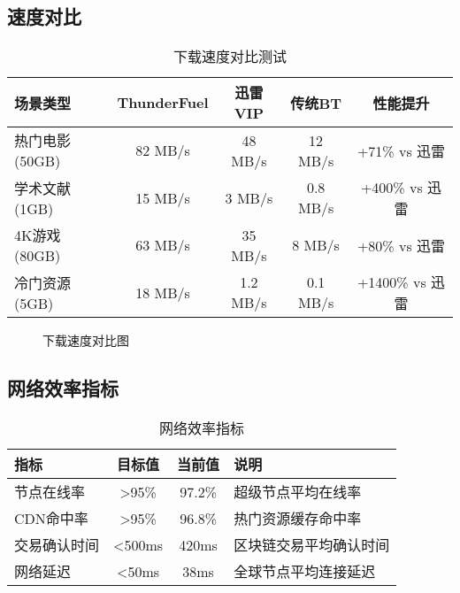 \documentclass[12pt,a4paper]{article}
\begin{document}
\subsection{速度对比}

\begin{table}[h]
\centering
\begin{tabular}{|l|c|c|c|c|}
\hline
\textbf{场景类型} & \textbf{ThunderFuel} & \textbf{迅雷VIP} & \textbf{传统BT} & \textbf{性能提升} \\
\hline
热门电影(50GB) & 82 MB/s & 48 MB/s & 12 MB/s & +71\% vs 迅雷 \\
\hline
学术文献(1GB) & 15 MB/s & 3 MB/s & 0.8 MB/s & +400\% vs 迅雷 \\
\hline
4K游戏(80GB) & 63 MB/s & 35 MB/s & 8 MB/s & +80\% vs 迅雷 \\
\hline
冷门资源(5GB) & 18 MB/s & 1.2 MB/s & 0.1 MB/s & +1400\% vs 迅雷 \\
\hline
\end{tabular}
\caption{下载速度对比测试}
\end{table}

\begin{figure}[h]
\centering
{}
\caption{下载速度对比图}
\end{figure}

\subsection{网络效率指标}

\begin{table}[h]
\centering
\begin{tabular}{|l|c|c|l|}
\hline
\textbf{指标} & \textbf{目标值} & \textbf{当前值} & \textbf{说明} \\
\hline
节点在线率 & >95\% & 97.2\% & 超级节点平均在线率 \\
\hline
CDN命中率 & >95\% & 96.8\% & 热门资源缓存命中率 \\
\hline
交易确认时间 & <500ms & 420ms & 区块链交易平均确认时间 \\
\hline
网络延迟 & <50ms & 38ms & 全球节点平均连接延迟 \\
\hline
\end{tabular}
\caption{网络效率指标}
\end{table}
\end{document}
